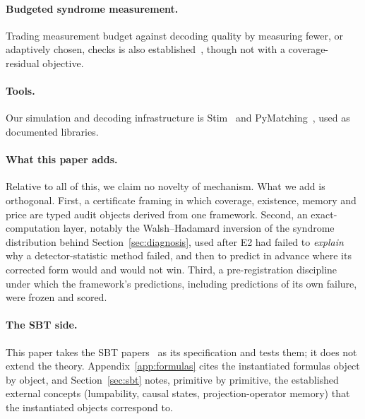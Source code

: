 \paragraph{Budgeted syndrome measurement.} Trading measurement budget against decoding quality by measuring fewer, or adaptively chosen, checks is also established~\cite{berthusen2024partialsyndrome,tansuwannont2023adaptivesyndrome,berthusen2025adaptivesyndrome}, though not with a coverage-residual objective.

\paragraph{Tools.} Our simulation and decoding infrastructure is Stim~\cite{gidney2021stim} and PyMatching~\cite{higgott2022pymatching,higgott2025sparseblossom}, used as documented libraries.

\paragraph{What this paper adds.} Relative to all of this, we claim no novelty of mechanism. What we add is orthogonal. First, a certificate framing in which coverage, existence, memory and price are typed audit objects derived from one framework. Second, an exact-computation layer, notably the Walsh--Hadamard inversion of the syndrome distribution behind Section~\ref{sec:diagnosis}, used after E2 had failed to \emph{explain} why a detector-statistic method failed, and then to predict in advance where its corrected form would and would not win. Third, a pre-registration discipline under which the framework's predictions, including predictions of its own failure, were frozen and scored.

\paragraph{The SBT side.} This paper takes the SBT papers~\cite{sbt-f1,sbt-f3,sbt-xi,sbt-hol,sbt-pt,sbt-ng,sbt-cast,sbt-xor,sbt-spend,sbt-qm,sbt-hid,sbt-nk} as its specification and tests them; it does not extend the theory. Appendix~\ref{app:formulas} cites the instantiated formulas object by object, and Section~\ref{sec:sbt} notes, primitive by primitive, the established external concepts (lumpability, causal states, projection-operator memory) that the instantiated objects correspond to.
